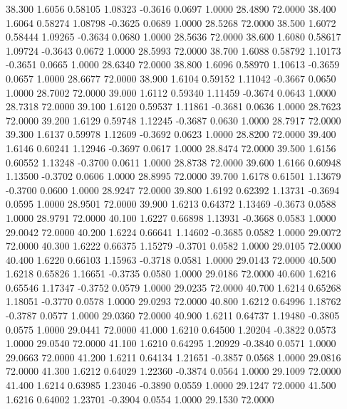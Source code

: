   38.300   1.6056   0.58105   1.08323  -0.3616   0.0697   1.0000  28.4890  72.0000
  38.400   1.6064   0.58274   1.08798  -0.3625   0.0689   1.0000  28.5268  72.0000
  38.500   1.6072   0.58444   1.09265  -0.3634   0.0680   1.0000  28.5636  72.0000
  38.600   1.6080   0.58617   1.09724  -0.3643   0.0672   1.0000  28.5993  72.0000
  38.700   1.6088   0.58792   1.10173  -0.3651   0.0665   1.0000  28.6340  72.0000
  38.800   1.6096   0.58970   1.10613  -0.3659   0.0657   1.0000  28.6677  72.0000
  38.900   1.6104   0.59152   1.11042  -0.3667   0.0650   1.0000  28.7002  72.0000
  39.000   1.6112   0.59340   1.11459  -0.3674   0.0643   1.0000  28.7318  72.0000
  39.100   1.6120   0.59537   1.11861  -0.3681   0.0636   1.0000  28.7623  72.0000
  39.200   1.6129   0.59748   1.12245  -0.3687   0.0630   1.0000  28.7917  72.0000
  39.300   1.6137   0.59978   1.12609  -0.3692   0.0623   1.0000  28.8200  72.0000
  39.400   1.6146   0.60241   1.12946  -0.3697   0.0617   1.0000  28.8474  72.0000
  39.500   1.6156   0.60552   1.13248  -0.3700   0.0611   1.0000  28.8738  72.0000
  39.600   1.6166   0.60948   1.13500  -0.3702   0.0606   1.0000  28.8995  72.0000
  39.700   1.6178   0.61501   1.13679  -0.3700   0.0600   1.0000  28.9247  72.0000
  39.800   1.6192   0.62392   1.13731  -0.3694   0.0595   1.0000  28.9501  72.0000
  39.900   1.6213   0.64372   1.13469  -0.3673   0.0588   1.0000  28.9791  72.0000
  40.100   1.6227   0.66898   1.13931  -0.3668   0.0583   1.0000  29.0042  72.0000
  40.200   1.6224   0.66641   1.14602  -0.3685   0.0582   1.0000  29.0072  72.0000
  40.300   1.6222   0.66375   1.15279  -0.3701   0.0582   1.0000  29.0105  72.0000
  40.400   1.6220   0.66103   1.15963  -0.3718   0.0581   1.0000  29.0143  72.0000
  40.500   1.6218   0.65826   1.16651  -0.3735   0.0580   1.0000  29.0186  72.0000
  40.600   1.6216   0.65546   1.17347  -0.3752   0.0579   1.0000  29.0235  72.0000
  40.700   1.6214   0.65268   1.18051  -0.3770   0.0578   1.0000  29.0293  72.0000
  40.800   1.6212   0.64996   1.18762  -0.3787   0.0577   1.0000  29.0360  72.0000
  40.900   1.6211   0.64737   1.19480  -0.3805   0.0575   1.0000  29.0441  72.0000
  41.000   1.6210   0.64500   1.20204  -0.3822   0.0573   1.0000  29.0540  72.0000
  41.100   1.6210   0.64295   1.20929  -0.3840   0.0571   1.0000  29.0663  72.0000
  41.200   1.6211   0.64134   1.21651  -0.3857   0.0568   1.0000  29.0816  72.0000
  41.300   1.6212   0.64029   1.22360  -0.3874   0.0564   1.0000  29.1009  72.0000
  41.400   1.6214   0.63985   1.23046  -0.3890   0.0559   1.0000  29.1247  72.0000
  41.500   1.6216   0.64002   1.23701  -0.3904   0.0554   1.0000  29.1530  72.0000
